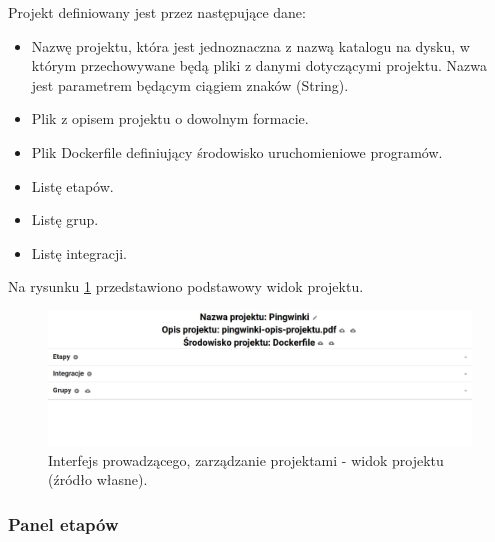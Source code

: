 Projekt definiowany jest przez następujące dane:
\begin {itemize}
    \item Nazwę projektu, która jest jednoznaczna z nazwą katalogu na dysku, w którym przechowywane będą pliki z danymi dotyczącymi projektu.
    Nazwa jest parametrem będącym ciągiem znaków (String).
    \item Plik z opisem projektu o dowolnym formacie.
    \item Plik Dockerfile definiujący środowisko uruchomieniowe programów.
    \item Listę etapów.
    \item Listę grup.
    \item Listę integracji.
\end {itemize}

Na rysunku \ref{fig:lecturer_project_board} przedstawiono podstawowy widok projektu.

\begin{figure}[h]
    \centering
    \includegraphics[width = 13cm]{chapter04/lecturer_project_board.png}
    \caption{Interfejs prowadzącego, zarządzanie projektami - widok projektu (źródło własne).}
    \label{fig:lecturer_project_board}
\end{figure}

\subsubsection{Panel etapów}

